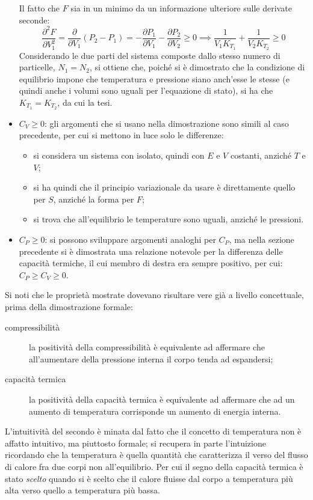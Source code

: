 \begin{itemize}
	Il fatto che $F$ sia in un minimo da un informazione ulteriore sulle derivate seconde:
	\begin{equation*}
	 \frac{\partial^2 F}{\partial V_1^2} =  \frac{\partial}{\partial V_1} (P_2 - P_1) =  -\frac{\partial P_1}{\partial V_1} -\frac{\partial P_2}{\partial V_2} \geq 0 \implies \frac{1}{V_1 K_{T_1}} + \frac{1}{V_2 K_{T_2}} \geq 0
	\end{equation*}
	Considerando le due parti del sistema composte dallo stesso numero di particelle, $N_1 = N_2$, si ottiene che, poiché si è dimostrato che la condizione di equilibrio impone che temperatura e pressione siano anch'esse le stesse (e quindi anche i volumi sono uguali per l'equazione di stato), si ha che $K_{T_1} = K_{T_2}$, da cui la tesi.
	\item $C_V \geq 0$: gli argomenti che si usano nella dimostrazione sono simili al caso precedente, per cui si mettono in luce solo le differenze:
	\begin{itemize}
		\item si considera un sistema con isolato, quindi con $E$ e $V$ costanti, anziché $T$ e $V$;
		\item si ha quindi che il principio variazionale da usare è direttamente quello per $S$, anziché la forma per $F$;
		\item si trova che all'equilibrio le temperature sono uguali, anziché le pressioni.
	\end{itemize}
	\item $C_P \geq 0$: si possono sviluppare argomenti analoghi per $C_P$, ma nella sezione precedente si è dimostrata una relazione notevole per la differenza delle capacità termiche, il cui membro di destra era sempre positivo, per cui: $C_P \geq C_V \geq 0$.
\end{itemize}

Si noti che le proprietà mostrate dovevano risultare vere già a livello concettuale, prima della dimostrazione formale:
\begin{description}
	\item[compressibilità] la positività della compressibilità è equivalente ad affermare che all'aumentare della pressione interna il corpo tenda ad espandersi;
	\item[capacità termica] la positività della capacità termica è equivalente ad affermare che ad un aumento di temperatura corrisponde un aumento di energia interna.
\end{description}

L'intuitività del secondo è minata dal fatto che il concetto di temperatura non è affatto intuitivo, ma piuttosto formale; si recupera in parte l'intuizione ricordando che la temperatura è quella quantità che caratterizza il verso del flusso di calore fra due corpi non all'equilibrio. Per cui il segno della capacità termica è stato \textit{scelto} quando si è scelto che il calore fluisse dal corpo a temperatura più alta verso quello a temperatura più bassa.

